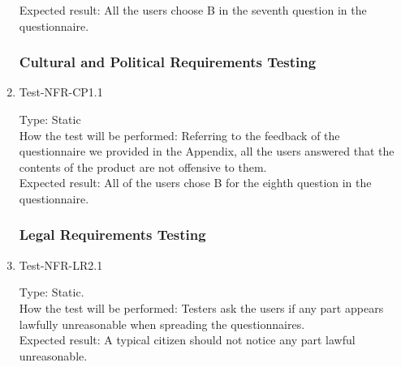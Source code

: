 \documentclass[12pt, titlepage]{article}
\begin{document}
\begin{enumerate}
Expected result: All the users choose B in the seventh question in the questionnaire.\\


\subsubsection{Cultural and Political Requirements Testing}

\item{Test-NFR-CP1.1\\}

Type: Static\\

How the test will be performed: Referring to the feedback of the questionnaire we provided in the Appendix, all the users answered that the contents of the product are not offensive to them.\\

Expected result: All of the users chose B for the eighth question in the questionnaire.


\subsubsection{Legal Requirements Testing}

\item{Test-NFR-LR2.1\\}

Type: Static.\\

How the test will be performed: Testers ask the users if any part appears lawfully unreasonable when spreading the questionnaires.\\

Expected result: A typical citizen should not notice any part lawful unreasonable. 
\end{enumerate}

\newpage
\end{document}

